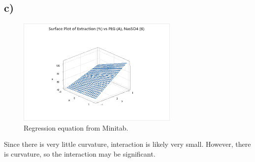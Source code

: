 \documentclass{article}
\begin{document}
\clearpage
\subsection*{c)}

\begin{figure}[h]
    \centering
    \includegraphics[width=0.7\textwidth]{./images/6_c.png}
    \caption{Regression equation from Minitab.}
    \label{fig:3_b_2}
\end{figure}

Since there is very little curvature, interaction is likely very small. However, there is curvature, so the interaction may be significant.
\end{document}
